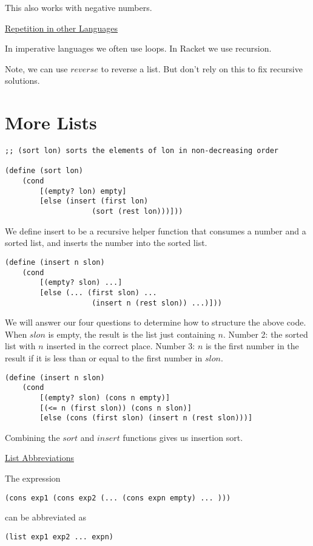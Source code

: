 \documentclass{article}
\begin{document}
This also works with negative numbers. 

\underline{Repetition in other Languages}

In imperative languages we often use loops. In Racket we use recursion. 

Note, we can use $reverse$ to reverse a list. But don't rely on this to fix recursive solutions. 


\section{More Lists}

\begin{lstlisting}
;; (sort lon) sorts the elements of lon in non-decreasing order

(define (sort lon)
    (cond 
        [(empty? lon) empty]
        [else (insert (first lon)
                    (sort (rest lon)))]))
\end{lstlisting}

We define insert to be a recursive helper function that consumes a number and a sorted list, and inserts the number into the sorted list. 

\begin{lstlisting}
(define (insert n slon)
    (cond
        [(empty? slon) ...]
        [else (... (first slon) ...
                    (insert n (rest slon)) ...)]))
\end{lstlisting}

We will answer our four questions to determine how to structure the above code. When $slon$ is empty, the result is the list just containing $n$. Number 2: the sorted list with $n$ inserted in the correct place. Number 3: $n$ is the first number in the result if it is less than or equal to the first number in $slon$. 

\begin{lstlisting}
(define (insert n slon)
    (cond
        [(empty? slon) (cons n empty)]
        [(<= n (first slon)) (cons n slon)]
        [else (cons (first slon) (insert n (rest slon)))]
\end{lstlisting}

Combining the $sort$ and $insert$ functions gives us insertion sort. 


\underline{List Abbreviations}

The expression 
\begin{lstlisting}
(cons exp1 (cons exp2 (... (cons expn empty) ... )))
\end{lstlisting}
can be abbreviated as
\begin{lstlisting}
(list exp1 exp2 ... expn)
\end{lstlisting}
\end{document}
